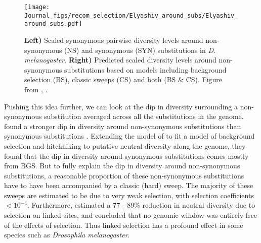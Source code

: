 \begin{figure}
\begin{center}
\texttt{[image: Journal\_figs/recom\_selection/Elyashiv\_around\_subs/Elyashiv\_around\_subs.pdf]}
\end{center}
\caption{ {\bf Left) }  Scaled synonymous pairwise diversity levels around non-synonymous
  (NS) and synonymous (SYN) substitutions in {\it
    D. melanogaster}. {\bf Right)} Predicted scaled diversity levels
  around non-synonymous substitutions based on models including
  background selection (BS), classic sweeps (CS) and both (BS \&
  CS). Figure from \citet{elyashiv2016genomic}, \PLOSccBY.} \label{fig:Elyashiv_around_subs}
\end{figure}

Pushing this idea further, we can look at the dip in diversity
surrounding a non-synonymous substitution averaged across all the
substitutions in the genome. \citet{elyashiv2016genomic} found a
stronger dip in diversity around non-synonymous substitutions than
synonymous substitutions \citep[see also
][]{sattath2011pervasive}. Extending
the model of \citet{Mcvicker:09} to fit a model of background selection and
hitchhiking to putative neutral diversity along the genome, they found that
the dip in diversity around synonymous substitutions comes mostly from
BGS. But to fully explain the dip in diversity around non-synonymous
substitutions, a reasonable proportion of these non-synonymous
substitutions have to have been accompanied by a classic (hard)
sweep. The majority of these sweeps are estimated to be due to very
weak selection, with selection coefficients $<10^{-4}$. Furthermore, \citet{elyashiv2016genomic} estimated a
 $77$ - $89\%$ reduction in neutral diversity due to selection on linked sites, and concluded that no genomic window was entirely
free of the effects of selection. Thus linked selection has a profound
effect in some species such as {\it Drosophila melanogaster}. 





